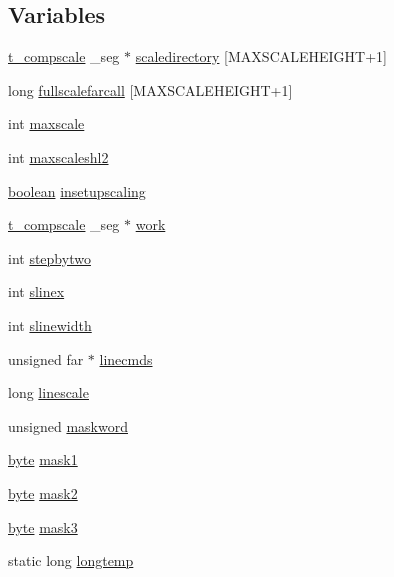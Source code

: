 \subsection*{Variables}
\begin{DoxyCompactItemize}
\item 
\hyperlink{structt__compscale}{t\_\-compscale} \_\-seg $\ast$ \hyperlink{WL__SCALE_8C_a79aa20f0658411ee8fe8706f15753026}{scaledirectory} \mbox{[}MAXSCALEHEIGHT+1\mbox{]}
\item 
long \hyperlink{WL__SCALE_8C_a4b3db832e1c51c7a13e5e973de3115b3}{fullscalefarcall} \mbox{[}MAXSCALEHEIGHT+1\mbox{]}
\item 
int \hyperlink{WL__SCALE_8C_a4531e3adda9a00231c5fc8b7a4644398}{maxscale}
\item 
int \hyperlink{WL__SCALE_8C_ac10b61c2a588ba00d9ecda54429e0a9d}{maxscaleshl2}
\item 
\hyperlink{ID__HEAD_8H_a7c6368b321bd9acd0149b030bb8275ed}{boolean} \hyperlink{WL__SCALE_8C_a8fb7a0719ca4fe8c02ecd0895589c0be}{insetupscaling}
\item 
\hyperlink{structt__compscale}{t\_\-compscale} \_\-seg $\ast$ \hyperlink{WL__SCALE_8C_a163511d4eb7f7ce00c635dc774a864c6}{work}
\item 
int \hyperlink{WL__SCALE_8C_aa80a217b0adae9ee21e078108c9ef3c5}{stepbytwo}
\item 
int \hyperlink{WL__SCALE_8C_aaec68c7e7f5e78b99df5b9ed716b35d2}{slinex}
\item 
int \hyperlink{WL__SCALE_8C_abd65d74dcd32e5501a3ecec638d65b0e}{slinewidth}
\item 
unsigned far $\ast$ \hyperlink{WL__SCALE_8C_aa68026c177907246bf15db85bc76f61c}{linecmds}
\item 
long \hyperlink{WL__SCALE_8C_ab632e78b4009b275cfa1629ac26b4be1}{linescale}
\item 
unsigned \hyperlink{WL__SCALE_8C_a6ccb606fa584e073646279771b40a0ee}{maskword}
\item 
\hyperlink{ID__HEAD_8H_a0c8186d9b9b7880309c27230bbb5e69d}{byte} \hyperlink{WL__SCALE_8C_a522ae19258cf30475ed90bb76819efb1}{mask1}
\item 
\hyperlink{ID__HEAD_8H_a0c8186d9b9b7880309c27230bbb5e69d}{byte} \hyperlink{WL__SCALE_8C_adadec9ebf5f6fe80150d567aa14fb9df}{mask2}
\item 
\hyperlink{ID__HEAD_8H_a0c8186d9b9b7880309c27230bbb5e69d}{byte} \hyperlink{WL__SCALE_8C_a2cf11bafb2cecc45d9388a79b54483b7}{mask3}
\item 
static long \hyperlink{WL__SCALE_8C_ab21e1dd6476595095fa335682b93094e}{longtemp}

\end{DoxyCompactItemize}
